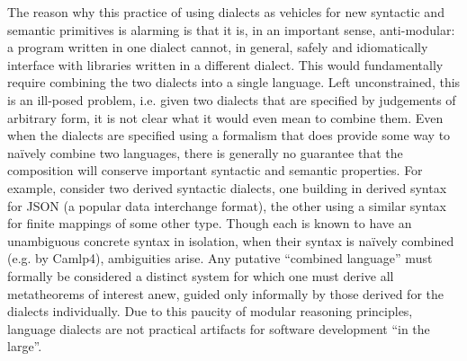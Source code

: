 The reason why this practice of using dialects as vehicles for new syntactic and semantic primitives is alarming is that it is, in an important sense,  anti-modular: a program written in one dialect cannot, in general, safely and idiomatically interface with libraries written in a different dialect. %
This would fundamentally require combining the two dialects into a single language. Left unconstrained, this is an ill-posed problem, i.e. given two dialects that are specified by judgements of arbitrary form, it is not clear what it would even mean to combine them. Even when the dialects are specified using a formalism that does provide some way to na\"ively combine two languages, there is generally no guarantee that the composition will conserve important syntactic and semantic properties. %
For example, consider two derived syntactic dialects, one building in derived syntax for JSON (a popular data interchange format), the other using a similar syntax for finite mappings of some other type. Though each is known to have an unambiguous concrete syntax in isolation, when their syntax is na\"ively  combined (e.g. by Camlp4), ambiguities arise.  Any putative ``combined language'' must formally be considered a  distinct system for which one must derive all metatheorems of interest anew, guided only informally by those derived for the dialects individually. %
Due to this paucity of modular reasoning principles, language dialects are not practical artifacts for software development ``in the large''. %

